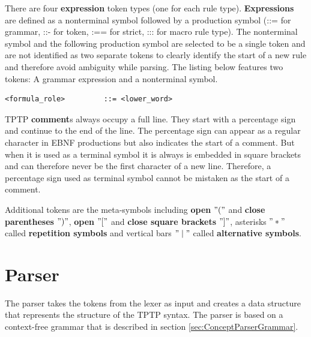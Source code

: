 There are four \textbf{expression} token types (one for each rule type).
\textbf{Expressions} are defined as a nonterminal symbol followed by a production symbol (::= for grammar, ::- for token, :== for strict, ::: for macro rule type).
The nonterminal symbol and the following production symbol are selected to be a single token and are not identified as two separate tokens to clearly identify the start of a new rule and therefore avoid ambiguity while parsing.
The listing below features two tokens: A grammar expression and a nonterminal symbol.
\begin{lstlisting}[caption= TPTP rule example]
<formula_role>         ::= <lower_word>
\end{lstlisting}
\ac{TPTP} \textbf{comment}s always occupy a full line. They start with a percentage sign and continue to the end of the line. The percentage sign can appear as a regular character in \ac{EBNF} productions but also indicates the start of a comment.
But when it is used as  a terminal symbol it is always is embedded in square brackets and can therefore never be the first character of a new line. Therefore, a percentage sign used as terminal symbol cannot be mistaken as the start of a comment.

Additional tokens are the meta-symbols including \textbf{open} $"("$ and \textbf{close parentheses} $")"$, \textbf{open} $"["$ and \textbf{close square brackets} $"]"$, asterisks $"*"$ called \textbf{repetition symbols} and vertical bars $"\mid"$ called \textbf{alternative symbols}.

\section{Parser}\label{sec:ConceptParser}
The parser takes the tokens from the lexer as input and creates a data structure that represents the structure of the \ac{TPTP} syntax. The parser is based on a context-free grammar that is described in section \ref{sec:ConceptParserGrammar}.

